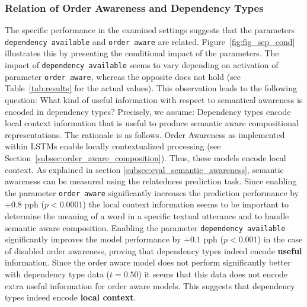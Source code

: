 \subsubsection{Relation of Order Awareness and Dependency Types} \label{subsec:results_relation_OA_DA}
The specific performance in the examined settings suggests that the parameters \texttt{dependency available} and \texttt{order aware} are related. Figure~\ref{fig:fig_sep_cond} illustrates this by presenting the conditional impact of the parameters. The impact of \texttt{dependency available} seems to vary depending on activation of parameter \texttt{order aware}, whereas the opposite does not hold (see Table~\ref{tab:results} for the actual values). This observation leads to the following question: What kind of useful information with respect to semantical awareness is encoded in dependency types? Precisely, we assume: Dependency types encode local context information that is useful to produce semantic aware compositional representations. The rationale is as follows. 
Order Awareness as implemented within \ac{LSTM}s enable locally contextualized processing (see Section~\ref{subsec:order_aware_composition}). Thus, these models encode local context.
As explained in section \ref{subsec:eval_semantic_awareness}, semantic awareness can be measured using the relatedness prediction task. Since enabling the parameter \texttt{order aware} significantly increases the prediction performance by $+0.8$ pph ($p < 0.0001$) the local context information seems to be important to determine the meaning of a word in a specific textual utterance and to handle semantic aware composition.
Enabling the parameter \texttt{dependency available} significantly improves the model performance by $+0.1$ pph ($p < 0.001$) in the case of disabled order awareness, proving that dependency types indeed encode \textbf{useful} information.
Since the order aware model does not perform significantly better with dependency type data ($t = 0.50$) it seems that this data does not encode extra useful information for order aware models.
This suggests that dependency types indeed encode \textbf{local context}.

